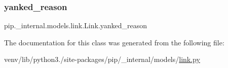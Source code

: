 \mbox{\label{classpip_1_1__internal_1_1models_1_1link_1_1Link_af68edcd6a5a6f4c22ea34802fbd83e9c}} 
\subsubsection{\texorpdfstring{yanked\+\_\+reason}{yanked\_reason}}
{\footnotesize\ttfamily pip.\+\_\+internal.\+models.\+link.\+Link.\+yanked\+\_\+reason\hspace{0.3cm}{\ttfamily [static]}}



The documentation for this class was generated from the following file\+:\begin{DoxyCompactItemize}
\item 
venv/lib/python3./site-\/packages/pip/\+\_\+internal/models/\hyperlink{link_8py}{link.\+py}\end{DoxyCompactItemize}

